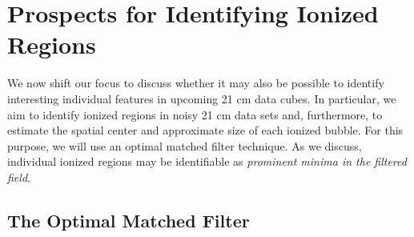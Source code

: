 \section{Prospects for Identifying Ionized Regions} \label{sec:ionprospects}

We now shift our focus to discuss whether it may also be possible
to identify interesting individual features in upcoming 21 cm data cubes.
In particular, we aim to identify ionized regions in noisy 21 cm data sets
and, furthermore, to estimate the spatial center and approximate size of each ionized bubble.
For this purpose, we will use an optimal matched filter technique. As we
discuss, individual
ionized regions may be identifiable as {\em prominent minima in the
filtered field}.

\subsection{The Optimal Matched Filter} \label{sec:optimal}


